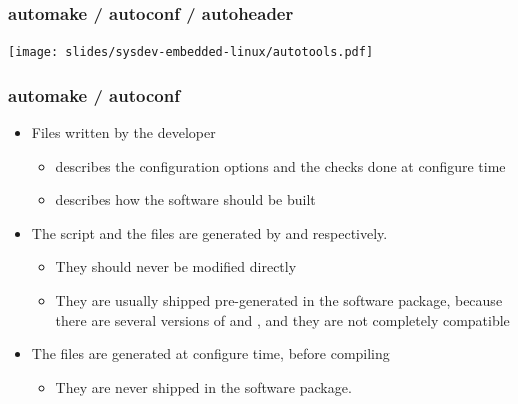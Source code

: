\begin{frame}
  \frametitle{automake / autoconf / autoheader}
  \begin{center}
    \texttt{[image: slides/sysdev-embedded-linux/autotools.pdf]}
  \end{center}
\end{frame}

\begin{frame}
  \frametitle{automake / autoconf}
  \begin{itemize}
  \item Files written by the developer
    \begin{itemize}
    \item {} describes the configuration options and
      the checks done at configure time
    \item {} describes how the software should be
      built
    \end{itemize}
  \item The  script and the  files
    are generated by  and  respectively.
    \begin{itemize}
    \item They should never be modified directly
    \item They are usually shipped pre-generated in the software
      package, because there are several versions of 
      and , and they are not completely compatible
    \end{itemize}
  \item The  files are generated at configure time, before
    compiling
    \begin{itemize}
    \item They are never shipped in the software package.
    \end{itemize}
  \end{itemize}
\end{frame}

